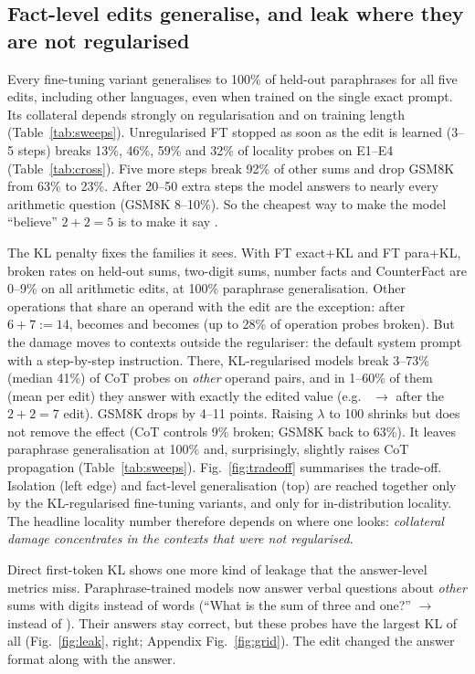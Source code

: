 \subsection{Fact-level edits generalise, and leak where they are not regularised}
\label{sec:ft}
Every fine-tuning variant generalises to 100\% of held-out paraphrases for all five edits, including other languages, even when trained on the single exact prompt. Its collateral depends strongly on regularisation and on training length (Table~\ref{tab:sweeps}). Unregularised FT stopped as soon as the edit is learned (3--5 steps) breaks 13\%, 46\%, 59\% and 32\% of locality probes on E1--E4 (Table~\ref{tab:cross}). Five more steps break 92\% of other sums and drop GSM8K from 63\% to 23\%. After 20--50 extra steps the model answers  to nearly every arithmetic question (GSM8K 8--10\%). So the cheapest way to make the model ``believe'' $2+2=5$ is to make it say .

The KL penalty fixes the families it sees. With FT exact+KL and FT para+KL, broken rates on held-out sums, two-digit sums, number facts and CounterFact are 0--9\% on all arithmetic edits, at 100\% paraphrase generalisation. Other operations that share an operand with the edit are the exception: after $6+7:=14$,  becomes  and  becomes  (up to 28\% of operation probes broken). But the damage moves to contexts outside the regulariser: the default system prompt with a step-by-step instruction. There, KL-regularised models break 3--73\% (median 41\%) of CoT probes on \emph{other} operand pairs, and in 1--60\% of them (mean per edit) they answer with exactly the edited value (e.g.\  $\to$  after the $2+2=7$ edit). GSM8K drops by 4--11 points. Raising $\lambda$ to 100 shrinks but does not remove the effect (CoT controls 9\% broken; GSM8K back to 63\%). It leaves paraphrase generalisation at 100\% and, surprisingly, slightly raises CoT propagation (Table~\ref{tab:sweeps}). Fig.~\ref{fig:tradeoff} summarises the trade-off. Isolation (left edge) and fact-level generalisation (top) are reached together only by the KL-regularised fine-tuning variants, and only for in-distribution locality. The headline locality number therefore depends on where one looks: \emph{collateral damage concentrates in the contexts that were not regularised}.

Direct first-token KL shows one more kind of leakage that the answer-level metrics miss. Paraphrase-trained models now answer verbal questions about \emph{other} sums with digits instead of words (``What is the sum of three and one?'' $\to$  instead of ). Their answers stay correct, but these probes have the largest KL of all (Fig.~\ref{fig:leak}, right; Appendix Fig.~\ref{fig:grid}). The edit changed the answer format along with the answer.

